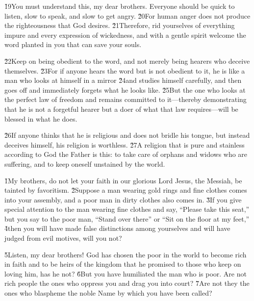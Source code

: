 \v{19}You must understand this, my dear brothers. Everyone should be quick to listen, slow to speak, and slow to get angry. \v{20}For human anger does not produce the righteousness that God desires. \v{21}Therefore, rid yourselves of everything impure and every expression of wickedness, and with a gentle spirit welcome the word planted in you that can save your souls.

\v{22}Keep on being obedient to the word, and not merely being hearers who deceive themselves. \v{23}For if anyone hears the word but is not obedient to it, he is like a man who looks at himself in a mirror \v{24}and studies himself carefully, and then goes off and immediately forgets what he looks like. \v{25}But the one who looks at the perfect law of freedom and remains committed to it---thereby demonstrating that he is not a forgetful hearer but a doer of what that law requires---will be blessed in what he does.

\v{26}If anyone thinks that he is religious and does not bridle his tongue, but instead deceives himself, his religion is worthless. \v{27}A religion that is pure and stainless according to God the Father is this: to take care of orphans and widows who are suffering, and to keep oneself unstained by the world.

\v{1}My brothers, do not let your faith in our glorious Lord Jesus, the Messiah, be tainted by favoritism. \v{2}Suppose a man wearing gold rings and fine clothes comes into your assembly, and a poor man in dirty clothes also comes in. \v{3}If you give special attention to the man wearing fine clothes and say, ``Please take this seat,'' but you say to the poor man, ``Stand over there'' or ``Sit on the floor at my feet,'' \v{4}then you will have made false distinctions among yourselves and will have judged from evil motives, will you not?

\v{5}Listen, my dear brothers! God has chosen the poor in the world to become rich in faith and to be heirs of the kingdom that he promised to those who keep on loving him, has he not? \v{6}But you have humiliated the man who is poor. Are not rich people the ones who oppress you and drag you into court? \v{7}Are not they the ones who blaspheme the noble Name by which you have been called?


